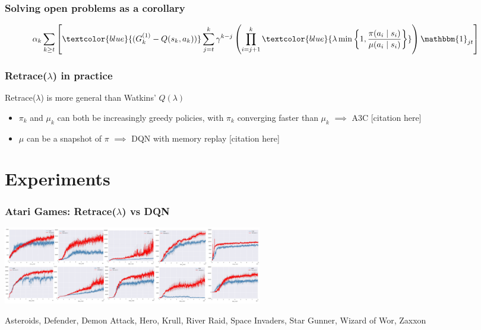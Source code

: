 \documentclass{beamer}
\begin{document}
\begin{frame}
\frametitle{Solving open problems as a corollary}
\begin{align*}
	&\alpha_k
	\sum_{k\geq t}\left[
	\textcolor{blue}{(G_k^{(1)} - Q(s_k,a_k))}
	\sum_{j=t}^k\gamma^{k-j}
	\left(\prod_{i=j+1}^k 
	\textcolor{blue}{\lambda\min\left\{1,\frac{\pi(a_i\mid s_i)}{\mu(a_i\mid s_i)}\right\}}
	\right)
	\mathbbm{1}_{jt}
	\right]
\end{align*}
\end{frame}

\begin{frame}
\frametitle{Retrace($\lambda$) in practice}
Retrace($\lambda$) is more general than Watkins' $Q(\lambda)$
\pause
\begin{itemize}
\item<2-> $\pi_k$ and $\mu_k$ can both be increasingly greedy policies, with $\pi_k$ converging faster than $\mu_k$ $\implies $ A3C [citation here]
\item<3-> $\mu$ can be a snapshot of $\pi$ $\implies$ DQN with memory replay [citation here]
\end{itemize}
\end{frame}
\section{Experiments}
\frame{\tableofcontents[currentsection]}

\begin{frame}
\frametitle{Atari Games: Retrace($\lambda$) vs DQN} 
\centering
\bigskip\bigskip
\includegraphics[height=3.4cm]{images/atari1}

Asteroids, Defender, Demon Attack, Hero, Krull,
River Raid, Space Invaders, Star Gunner, Wizard of Wor, Zaxxon
\end{frame}
\end{document}

